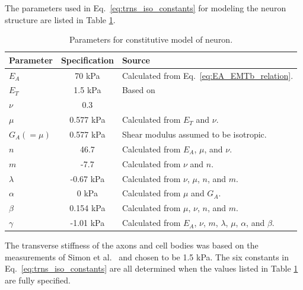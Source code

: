 \documentclass[]{interact}
\begin{document}
The parameters used in Eq.\ \eqref{eq:trns_iso_constants} for modeling the neuron structure are listed in Table \ref{table:neuron_parameters}. 
\begin{table}[ht]
\begin{center}
\begin{tabular}{ l c l }
\hline \hline
Parameter & Specification & Source\\
 \hline
$E_A $ & 70 kPa & Calculated from Eq.\ \eqref{eq:EA_EMTb_relation}. \\ 
$E_T $ & 1.5 kPa & Based on \cite{Simon:2016ig} \\
$\nu $ & 0.3 & \\
$\mu $ & 0.577 kPa & Calculated from $E_T$ and $\nu$. \\ 
$G_A (= \mu) $ & 0.577 kPa & Shear modulus assumed to be isotropic.\\ 
\hline
$n $ & 46.7 & Calculated from $E_A$, $\mu$, and $\nu$. \\
$m $ & -7.7 & Calculated from $\nu$ and $n$. \\
$\lambda $ &  -0.67 kPa & Calculated from $\nu$, $\mu$, $n$, and $m$. \\
$\alpha $ & 0 kPa & Calculated from $\mu$ and $G_A$. \\
$\beta $ & 0.154 kPa & Calculated from $\mu$, $\nu$, $n$, and $m$. \\
$\gamma $ & -1.01 kPa & Calculated from $E_A$, $\nu$, $m$, $\lambda$, $\mu$, $\alpha$, and $\beta$.\\
\hline \hline
\end{tabular}
\end{center}
\caption{Parameters for constitutive model of neuron.}
\label{table:neuron_parameters}
\end{table}
%
The transverse stiffness of the axons and cell bodies was based on the measurements of Simon et al.\ \citep{Simon:2016ig} and chosen to be 1.5 kPa. The six constants in Eq.\ \eqref{eq:trns_iso_constants} are all determined when the values listed in Table \ref{table:neuron_parameters} are fully specified.
\end{document}
